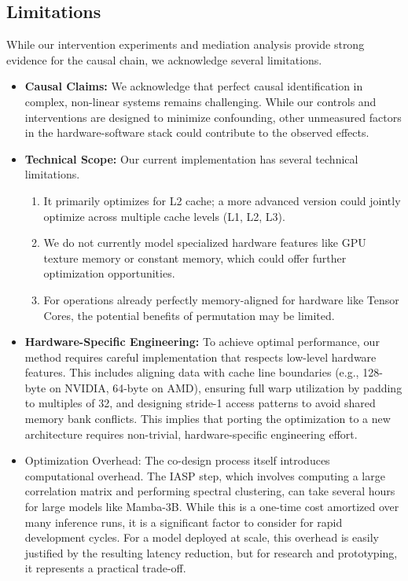 \documentclass{article}
\begin{document}
\subsection{Limitations}
While our intervention experiments and mediation analysis provide strong evidence for the causal chain, we acknowledge several limitations.
\begin{itemize}
    \item \textbf{Causal Claims:} We acknowledge that perfect causal identification in complex, non-linear systems remains challenging. While our controls and interventions are designed to minimize confounding, other unmeasured factors in the hardware-software stack could contribute to the observed effects.
    \item \textbf{Technical Scope:} Our current implementation has several technical limitations.
    \begin{enumerate}
        \item It primarily optimizes for L2 cache; a more advanced version could jointly optimize across multiple cache levels (L1, L2, L3).
        \item We do not currently model specialized hardware features like GPU texture memory or constant memory, which could offer further optimization opportunities.
        \item For operations already perfectly memory-aligned for hardware like Tensor Cores, the potential benefits of permutation may be limited.
    \end{enumerate}
    \item \textbf{Hardware-Specific Engineering:} To achieve optimal performance, our method requires careful implementation that respects low-level hardware features. This includes aligning data with cache line boundaries (e.g., 128-byte on NVIDIA, 64-byte on AMD), ensuring full warp utilization by padding to multiples of 32, and designing stride-1 access patterns to avoid shared memory bank conflicts. This implies that porting the optimization to a new architecture requires non-trivial, hardware-specific engineering effort.
    \item Optimization Overhead: The co-design process itself introduces computational overhead. The IASP step, which involves computing a large correlation matrix and performing spectral clustering, can take several hours for large models like Mamba-3B. While this is a one-time cost amortized over many inference runs, it is a significant factor to consider for rapid development cycles. For a model deployed at scale, this overhead is easily justified by the resulting latency reduction, but for research and prototyping, it represents a practical trade-off.
\end{itemize}
\end{document}
